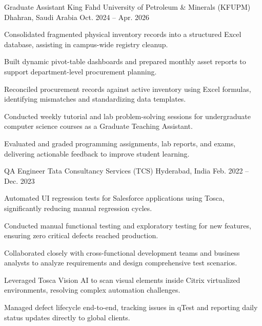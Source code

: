 

\begin{cventries}

  \cventry
    {Graduate Assistant} %
    {King Fahd University of Petroleum \& Minerals (KFUPM)} %
    {Dhahran, Saudi Arabia} %
    {Oct. 2024 – Apr. 2026} %
    {
      \begin{cvitems}
        \item {Consolidated fragmented physical inventory records into a structured Excel database, assisting in campus-wide registry cleanup.}
        \item {Built dynamic pivot-table dashboards and prepared monthly asset reports to support department-level procurement planning.}
        \item {Reconciled procurement records against active inventory using Excel formulas, identifying mismatches and standardizing data templates.}
        \item {Conducted weekly tutorial and lab problem-solving sessions for undergraduate computer science courses as a Graduate Teaching Assistant.}
        \item {Evaluated and graded programming assignments, lab reports, and exams, delivering actionable feedback to improve student learning.}
      \end{cvitems}
    }

  \cventry
    {QA Engineer} %
    {Tata Consultancy Services (TCS)} %
    {Hyderabad, India} %
    {Feb. 2022 – Dec. 2023} %
    {
      \begin{cvitems}
        \item {Automated UI regression tests for Salesforce applications using Tosca, significantly reducing manual regression cycles.}
        \item {Conducted manual functional testing and exploratory testing for new features, ensuring zero critical defects reached production.}
        \item {Collaborated closely with cross-functional development teams and business analysts to analyze requirements and design comprehensive test scenarios.}
        \item {Leveraged Tosca Vision AI to scan visual elements inside Citrix virtualized environments, resolving complex automation challenges.}
        \item {Managed defect lifecycle end-to-end, tracking issues in qTest and reporting daily status updates directly to global clients.}
      \end{cvitems}
    }

\end{cventries}
